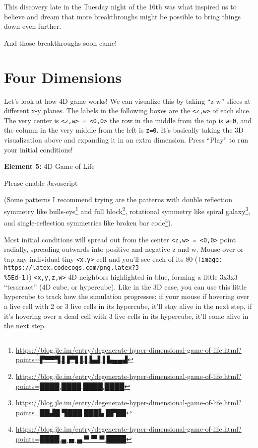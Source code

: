 \documentclass[]{article}
\renewcommand{\href}[2]{#2\footnote{\url{#1}}}
\begin{document}
This discovery late in the Tuesday night of the 16th was what inspired us to
believe and dream that more breakthroughs might be possible to bring things down
even further.

And those breakthroughs soon came!

\hypertarget{four-dimensions}{%
\section{Four Dimensions}\label{four-dimensions}}

Let's look at how 4D game works! We can visualize this by taking ``z-w'' slices
at different x-y planes. The labels in the following boxes are the
\texttt{\textless{}z,w\textgreater{}} of each slice. The very center is
\texttt{\textless{}z,w\textgreater{}\ =\ \textless{}0,0\textgreater{}} the row
in the middle from the top is \texttt{w=0}, and the column in the very middle
from the left is \texttt{z=0}. It's basically taking the 3D visualization above
and expanding it in an extra dimension. Press ``Play'' to run your initial
conditions!

\leavevmode\hypertarget{gol4D}{}%
\textbf{Element 5:} 4D Game of Life

\leavevmode\hypertarget{gol4DCont}{}%
Please enable Javascript

(Some patterns I recommend trying are the patterns with double reflection
symmetry like
\href{https://blog.jle.im/entry/degenerate-hyper-dimensional-game-of-life.html?points=▛▀▀▜.▌▛▜▐.▌▙▟▐.▙▄▄▟}{bulls-eye}
and
\href{https://blog.jle.im/entry/degenerate-hyper-dimensional-game-of-life.html?points=████.████.████.████}{full
block}, rotational symmetry like
\href{https://blog.jle.im/entry/degenerate-hyper-dimensional-game-of-life.html?points=██▟█.▜███.███▙.█▛██}{spiral
galaxy}, and single-reflection symmetries like
\href{https://blog.jle.im/entry/degenerate-hyper-dimensional-game-of-life.html?points=████.▄▗▖▄.▀▝▘▀.████}{broken
bar code}).

Most initial conditions will spread out from the center
\texttt{\textless{}z,w\textgreater{}\ =\ \textless{}0,0\textgreater{}} point
radially, spreading outwards into positive and negative z and w. Mouse-over or
tap any individual tiny \texttt{\textless{}x.y\textgreater{}} cell and you'll
see each of its 80
(\texttt{[image: https://latex.codecogs.com/png.latex?3\\\%5Ed-1]})
\texttt{\textless{}x,y,z,w\textgreater{}} 4D neighbors highlighted in blue,
forming a little 3x3x3 ``tesseract'' (4D cube, or hypercube). Like in the 3D
case, you can use this little hypercube to track how the simulation progresses:
if your mouse if hovering over a live cell with 2 or 3 live cells in its
hypercube, it'll stay alive in the next step, if it's hovering over a dead cell
with 3 live cells in its hypercube, it'll come alive in the next step.
\end{document}
